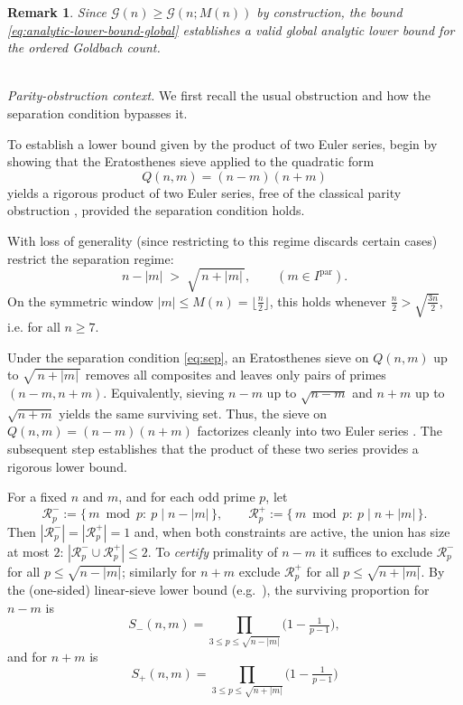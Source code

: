 \documentclass[11pt]{article}
\makeatletter
\theoremstyle{inline}
\newtheorem*{remark}{Remark}
\theoremstyle{break}
\renewenvironment{proof}[1][\proofname]{%
  \par\pushQED{\qed}%
  \normalfont \topsep6\p@\@plus6\p@\relax
  \trivlist
  \item[\hskip\labelsep
        \itshape
    #1\@addpunct{.}]\mbox{}\\  %
}{%
  \popQED\endtrivlist\@endpefalse
}
\theoremstyle{break}
\theoremstyle{break}
\theoremstyle{break}
\theoremstyle{break}
\theoremstyle{break}
\theoremstyle{break}
\theoremstyle{inline}
\makeatother
\begin{document}
\begin{remark}
Since \(\mathcal{G}(n) \ge \mathcal{G}(n;M(n))\) by construction, the bound
\eqref{eq:analytic-lower-bound-global} establishes a valid global
analytic lower bound for the ordered Goldbach count.
\end{remark}

\begin{proof}
\emph{Parity-obstruction context.} We first recall the usual obstruction and how the separation condition bypasses it.

To establish a lower bound given by the product of two Euler series, begin by showing that the Eratosthenes sieve \cite{FriedlanderIwaniec2010} applied to the quadratic form
\begin{equation}
Q(n,m)=(n-m)(n+m)
\end{equation}
yields a rigorous product of two Euler series, free of the
classical parity obstruction \cite{Chen1973, IwaniecKowalski2004}, provided the separation condition holds.

With loss of generality (since restricting to this regime discards certain cases) restrict the separation regime:
\begin{equation}\label{eq:sep}
n-|m|\;>\;\sqrt{\,n+|m|\,}, \qquad (m\in I^{\mathrm{par}}).
\end{equation}
On the symmetric window \(|m|\le M(n)=\lfloor \frac{n}{2} \rfloor\), this holds whenever
\(\frac{n}{2} > \sqrt{\frac{3n}{2}}\), i.e. for all \(n\ge7\).  

Under the separation condition \eqref{eq:sep}, an Eratosthenes sieve on \(Q(n,m)\) up to
\(\sqrt{\,n+|m|\,}\) removes all composites and leaves only pairs of primes
\((n-m,n+m)\). Equivalently, sieving \(n-m\) up to \(\sqrt{n-m}\) and \(n+m\)
up to \(\sqrt{n+m}\) yields the same surviving set. Thus, the sieve on
\(Q(n,m)=(n-m)(n+m)\) factorizes cleanly into two Euler series
\cite{Vaughan1997}. The subsequent step establishes that the product of these
two series provides a rigorous lower bound.

For a fixed \(n\) and \(m\), and for each odd prime \(p\), let
\begin{equation}
\mathcal R_p^-:=\{\,m\bmod p:\ p\mid n-|m|\,\},\qquad
\mathcal R_p^+:=\{\,m\bmod p:\ p\mid n+|m|\,\}.
\end{equation}
Then \(|\mathcal R_p^-|=|\mathcal R_p^+|=1\) and, when both constraints are active,
the union has size at most \(2\):
\(|\mathcal R_p^-\cup\mathcal R_p^+|\le 2\).
To \emph{certify} primality of \(n\!-\!m\) it suffices to exclude
\(\mathcal R_p^-\) for all \(p\le\sqrt{n-|m|}\); similarly for \(n\!+\!m\)
exclude \(\mathcal R_p^+\) for all \(p\le\sqrt{n+|m|}\).
By the (one-sided) linear-sieve lower bound (e.g.~\cite[Ch.~6]{IwaniecKowalski2004}),
the surviving proportion for \(n\!-\!m\) is
\begin{equation}
S_-(n,m) = \prod_{3\le p\le \sqrt{n-|m|}}\!\bigl(1-\tfrac{1}{p-1}\bigr),
\end{equation}
and for \(n\!+\!m\) is
\begin{equation}
S_+(n,m) = \prod_{3\le p\le \sqrt{n+|m|}}\!\bigl(1-\tfrac{1}{p-1}\bigr)
\end{equation}


\end{proof}
\end{document}
